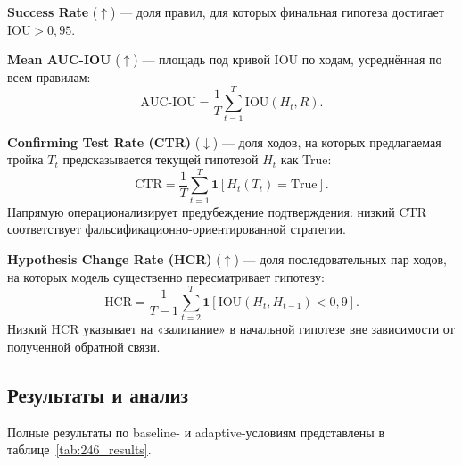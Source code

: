 \textbf{Success Rate} ($\uparrow$) --- доля правил, для которых финальная гипотеза достигает $\text{IOU} > 0{,}95$.

\textbf{Mean AUC-IOU} ($\uparrow$) --- площадь под кривой IOU по ходам, усреднённая по всем правилам:
\begin{equation}
  \text{AUC-IOU} = \frac{1}{T} \sum_{t=1}^{T} \text{IOU}(H_t, R).
  \label{eq:auc_iou}
\end{equation}

\textbf{Confirming Test Rate (CTR)} ($\downarrow$) --- доля ходов, на которых предлагаемая тройка $T_t$ предсказывается текущей гипотезой $H_t$ как True:
\begin{equation}
  \text{CTR} = \frac{1}{T} \sum_{t=1}^{T} \mathbf{1}[H_t(T_t) = \text{True}].
  \label{eq:ctr}
\end{equation}
Напрямую операционализирует предубеждение подтверждения: низкий CTR соответствует фальсификационно-ориентированной стратегии.

\textbf{Hypothesis Change Rate (HCR)} ($\uparrow$) --- доля последовательных пар ходов, на которых модель существенно пересматривает гипотезу:
\begin{equation}
  \text{HCR} = \frac{1}{T-1} \sum_{t=2}^{T} \mathbf{1}[\text{IOU}(H_t, H_{t-1}) < 0{,}9].
  \label{eq:hcr}
\end{equation}
Низкий HCR указывает на «залипание» в начальной гипотезе вне зависимости от полученной обратной связи.

\subsection{Результаты и анализ}

Полные результаты по baseline- и adaptive-условиям представлены в таблице~\ref{tab:246_results}.

